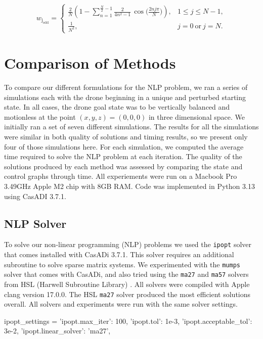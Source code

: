 \documentclass[]{article}
\begin{document}
	\[
        w_{\mathrm{j_{odd}}} =
        \begin{cases}
        \displaystyle
        \frac{2}{N}\!\left(
        1 - \sum_{n=1}^{\frac{N}{2}-1} \frac{2}{4n^{2}-1}\,
        \cos\!\Big(\tfrac{2 n j \pi}{N}\Big)
        \right), & 1 \le j \le N-1, \\[2ex]
        \displaystyle \frac{1}{N^{2}}, & j=0\ \text{or}\ j=N.
        \end{cases}
        \]

\section*{Comparison of Methods}

To compare our different formulations for the NLP problem, we ran a series of simulations each with the drone beginning in a unique and perturbed starting state. In all cases, the drone goal state was to be vertically balanced and motionless at the point $(x,y,z) = (0, 0, 0)$ in three dimensional space. We initially ran a set of seven different simulations. The results for all the simulations were similar in both quality of solutions and timing results, so we present only four of those simulations here.  For each simulation, we computed the average time required to solve the NLP problem at each iteration. The quality of the solutions produced by each method was assessed by comparing the state and control graphs through time. All experiements were run on a Macbook Pro  3.49GHz Apple M2 chip with 8GB RAM. Code was implemented in Python 3.13 using CasADI 3.7.1. 
	
	\subsection*{NLP Solver}
	To solve our non-linear programming (NLP) problems we used the \texttt{ipopt} solver that comes installed with CasADi 3.7.1.  This solver requires an additional subroutine to  solve sparse matrix systems. We experimented with the \texttt{mumps}  solver that comes with CasADi, and also tried using the  \texttt{ma27} and  \texttt{ma57} solvers  from HSL (Harwell Subroutine Library) \cite{hsl}. All solvers were compiled with Apple clang version 17.0.0. The HSL \texttt{ma27} solver produced the most efficient solutions overall. All solvers and experiments were run with the same solver settings.
	\vspace{\baselineskip}
	\begin{python}
        ipopt_settings = {
			'ipopt.max_iter': 100,                  
			'ipopt.tol': 1e-3,                      	
			'ipopt.acceptable_tol': 3e-2,
			'ipopt.linear_solver': 'ma27',
		}
	\end{python}
\end{document}
